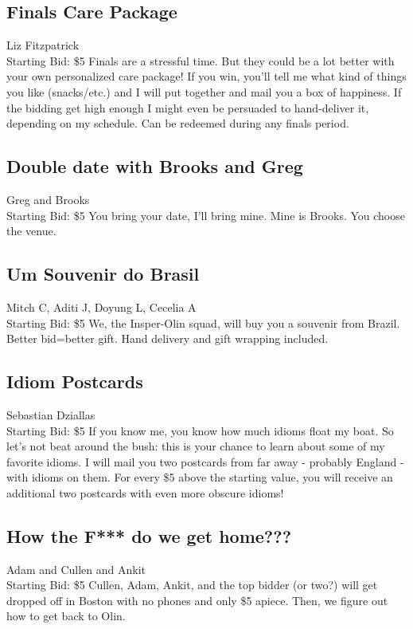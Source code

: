 \documentclass[11pt]{article}
\begin{document}
\subsection{Finals Care Package}
Liz Fitzpatrick
\\
Starting Bid: \$5
\newline
Finals are a stressful time. But they could be a lot better with your own personalized care package! If you win, you'll tell me what kind of things you like (snacks/etc.) and I will put together and mail you a box of happiness. If the bidding get high enough I might even be persuaded to hand-deliver it, depending on my schedule. Can be redeemed during any finals period.
\subsection{Double date with Brooks and Greg}
Greg and Brooks
\\
Starting Bid: \$5
\newline
You bring your date, I'll bring mine. Mine is Brooks. You choose the venue.
\subsection{Um Souvenir do Brasil}
Mitch C, Aditi J, Doyung L, Cecelia A
\\
Starting Bid: \$5
\newline
We, the Insper-Olin squad, will buy you a souvenir from Brazil. Better bid=better gift. Hand delivery and gift wrapping included.
\subsection{Idiom Postcards}
Sebastian Dziallas
\\
Starting Bid: \$5
\newline
If you know me, you know how much idioms float my boat. So let's not beat around the bush: this is your chance to learn about some of my favorite idioms. I will mail you two postcards from far away - probably England - with idioms on them. For every \$5 above the starting value, you will receive an additional two postcards with even more obscure idioms!
\subsection{How the F*** do we get home???}
Adam and Cullen and Ankit
\\
Starting Bid: \$5
\newline
Cullen, Adam, Ankit, and the top bidder (or two?) will get dropped off in Boston with no phones and only \$5 apiece. Then, we figure out how to get back to Olin.
\end{document}
